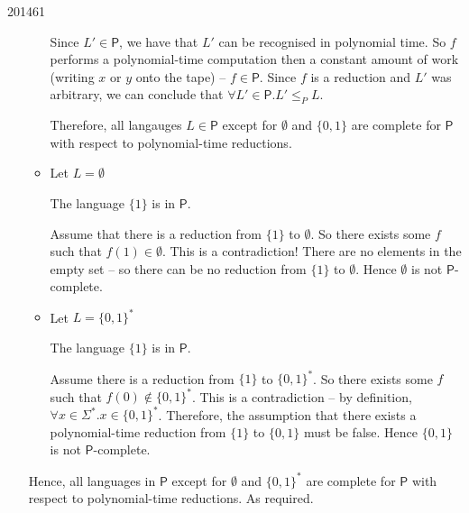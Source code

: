 \documentclass[10pt,\jkfside,a4paper]{article}
\begin{document}
\begin{examquestion}{2014}{6}{1}
\begin{enumerate}[label=(\alph*)]
\begin{itemize}
Since $L' \in \mathsf{P}$, we have that $L'$ can be recognised in polynomial
time. So $f$ performs a polynomial-time computation then a constant
amount of work (writing $x$ or $y$ onto the tape) -- $f \in \mathsf P$. Since
$f$ is a reduction and $L'$ was arbitrary, we can conclude that $\forall L'
\in \mathsf P. L' \le_P L$.

Therefore, all langauges $L \in \mathsf P$ except for $\emptyset$ and $\{0, 1
\}$ are complete for $\mathsf P$ with respect to polynomial-time reductions.

\item Let $L = \emptyset$

The language $\{1\}$ is in $\mathsf P$.

Assume that there is a reduction from $\{1\}$ to $\emptyset$.
So there exists some $f$ such that $f(1) \in \emptyset$. This is a
contradiction! There are no elements in the empty set -- so there can be no
reduction from $\{1\}$ to $\emptyset$. Hence $\emptyset$ is not $\mathsf
P$-complete.

\item Let $L = \{0, 1\}^*$

The language $\{1\}$ is in $\mathsf P$.

Assume there is a reduction from $\{1\}$ to $\{0, 1\}^*$. So there exists
some $f$ such that $f(0) \notin \{0, 1\}^*$. This is a contradiction -- by
definition, $\forall x \in \Sigma^*. x \in \{0, 1\}^*$. Therefore, the
assumption that there exists a polynomial-time reduction from $\{1\}$ to
$\{0, 1\}$ must be false. Hence $\{0, 1\}$ is not $\mathsf P$-complete.

\end{itemize}

Hence, all languages in $\mathsf P$ except for $\emptyset$ and $\{0, 1\}^*$
are complete for $\mathsf P$ with respect to polynomial-time reductions. As
required.

\end{enumerate}

\end{examquestion}
\end{document}

